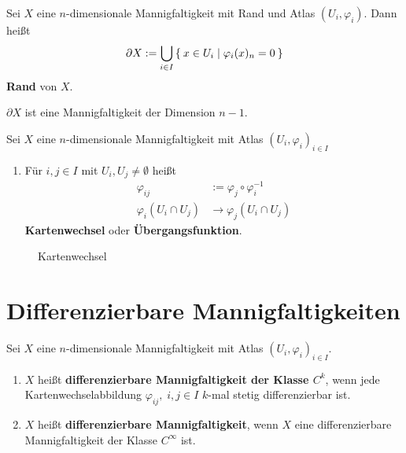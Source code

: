 \begin{definition}
    Sei $X$ eine $n$-dimensionale Mannigfaltigkeit mit Rand und
    Atlas $(U_i, \varphi_i)$. Dann heißt 
    \[\partial X := \bigcup_{i\in I} \Set{x \in U_i | \varphi_i (x)_n = 0}\]
    \textbf{Rand} von $X$.
\end{definition}

$\partial X$ ist eine Mannigfaltigkeit der Dimension $n-1$.

\begin{definition}
    Sei $X$ eine $n$-dimensionale Mannigfaltigkeit mit Atlas
    $(U_i, \varphi_i)_{i \in I}$

    \begin{enumerate}[label=\alph*)]
        \item Für $i, j \in I$ mit $U_i, U_j \neq \emptyset$ heißt
              \begin{align*}
                \varphi_{ij} &:= \varphi_j \circ \varphi_i^{-1}\\
                \varphi_i (U_i \cap U_j) &\rightarrow \varphi_j (U_i \cap U_j)
              \end{align*}
              \textbf{Kartenwechsel} oder \textbf{Übergangsfunktion}.
    \end{enumerate}
\end{definition}

\begin{figure}[htp]
    \centering
    
    \caption{Kartenwechsel}
    \label{fig:kartenwechsel}
\end{figure}

\section{Differenzierbare Mannigfaltigkeiten}
\begin{definition}
    Sei $X$ eine $n$-dimensionale Mannigfaltigkeit mit Atlas $(U_i, \varphi_i)_{i \in I}$.

    \begin{enumerate}[label=\alph*)]
        \item $X$ heißt \textbf{differenzierbare Mannigfaltigkeit der Klasse $C^k$},
              wenn jede Kartenwechselabbildung $\varphi_{ij},\;i,j \in I$
              $k$-mal stetig differenzierbar ist.
        \item $X$ heißt \textbf{differenzierbare Mannigfaltigkeit},
              wenn $X$ eine differenzierbare Mannigfaltigkeit der
              Klasse $C^\infty$ ist.
    \end{enumerate}
\end{definition}


